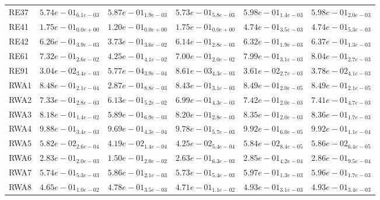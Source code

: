\documentclass{article}
\begin{document}
\begin{table}
\begin{scriptsize}
\begin{tabular}{llllll}
RE37 & $  5.74e-01_{ 6.1e-03}$ & $  5.87e-01_{ 1.9e-03}$ & $  5.73e-01_{ 5.8e-03}$ & \cellcolor{gray95}$  5.98e-01_{ 1.4e-03}$ & \cellcolor{gray25}$  5.98e-01_{ 2.0e-03}$ \\
RE41 & $  1.75e-01_{ 0.0e+00}$ & $  1.20e-01_{ 0.0e+00}$ & $  1.75e-01_{ 0.0e+00}$ & \cellcolor{gray95}$  4.74e-01_{ 3.5e-03}$ & \cellcolor{gray25}$  4.74e-01_{ 5.3e-03}$ \\
RE42 & $  6.26e-01_{ 3.9e-03}$ & $  3.73e-01_{ 3.6e-02}$ & $  6.14e-01_{ 2.8e-03}$ & \cellcolor{gray25}$  6.32e-01_{ 1.9e-03}$ & \cellcolor{gray95}$  6.37e-01_{ 1.3e-03}$ \\
RE61 & $  7.32e-01_{ 2.6e-02}$ & $  4.25e-01_{ 4.1e-02}$ & $  7.00e-01_{ 2.0e-02}$ & \cellcolor{gray25}$  7.99e-01_{ 3.1e-03}$ & \cellcolor{gray95}$  8.04e-01_{ 2.7e-03}$ \\
RE91 & $  3.04e-02_{ 3.4e-03}$ & $  5.77e-04_{ 3.9e-04}$ & $  8.61e-03_{ 4.3e-03}$ & \cellcolor{gray25}$  3.61e-02_{ 2.7e-03}$ & \cellcolor{gray95}$  3.78e-02_{ 4.1e-03}$ \\
RWA1 & $  8.48e-01_{ 2.1e-04}$ & $  2.87e-01_{ 8.8e-03}$ & $  8.43e-01_{ 3.1e-03}$ & \cellcolor{gray95}$  8.49e-01_{ 2.0e-05}$ & \cellcolor{gray25}$  8.49e-01_{ 2.1e-05}$ \\
RWA2 & $  7.33e-01_{ 2.8e-03}$ & $  6.13e-01_{ 5.2e-02}$ & $  6.99e-01_{ 4.3e-03}$ & \cellcolor{gray95}$  7.42e-01_{ 2.0e-03}$ & \cellcolor{gray25}$  7.41e-01_{ 4.7e-03}$ \\
RWA3 & $  8.18e-01_{ 1.4e-02}$ & $  5.89e-01_{ 6.9e-03}$ & $  8.20e-01_{ 2.8e-03}$ & \cellcolor{gray25}$  8.35e-01_{ 2.0e-03}$ & \cellcolor{gray95}$  8.36e-01_{ 1.7e-03}$ \\
RWA4 & $  9.88e-01_{ 3.4e-03}$ & $  9.69e-01_{ 4.3e-04}$ & $  9.78e-01_{ 5.7e-03}$ & \cellcolor{gray25}$  9.92e-01_{ 6.0e-05}$ & \cellcolor{gray95}$  9.92e-01_{ 1.1e-04}$ \\
RWA5 & $  5.82e-02_{ 2.6e-04}$ & $  4.19e-02_{ 1.4e-04}$ & $  4.25e-02_{ 5.4e-04}$ & \cellcolor{gray25}$  5.84e-02_{ 8.4e-05}$ & \cellcolor{gray95}$  5.86e-02_{ 6.4e-05}$ \\
RWA6 & $  2.83e-01_{ 2.0e-03}$ & $  1.50e-01_{ 2.0e-02}$ & $  2.63e-01_{ 6.3e-03}$ & \cellcolor{gray25}$  2.85e-01_{ 4.2e-04}$ & \cellcolor{gray95}$  2.86e-01_{ 9.5e-04}$ \\
RWA7 & $  5.74e-01_{ 5.3e-03}$ & $  5.86e-01_{ 2.1e-03}$ & $  5.73e-01_{ 5.4e-03}$ & \cellcolor{gray95}$  5.97e-01_{ 1.3e-03}$ & \cellcolor{gray25}$  5.96e-01_{ 1.7e-03}$ \\
RWA8 & $  4.65e-01_{ 1.0e-02}$ & $  4.78e-01_{ 3.5e-03}$ & $  4.71e-01_{ 1.1e-02}$ & \cellcolor{gray25}$  4.93e-01_{ 3.1e-03}$ & \cellcolor{gray95}$  4.93e-01_{ 3.4e-03}$ \\

\end{tabular}
\end{scriptsize}
\end{table}
\end{document}
